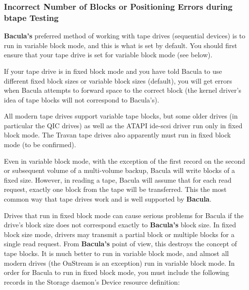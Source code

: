 \label{IncorrectBlocks}

\subsubsection*{Incorrect Number of Blocks or Positioning Errors during btape
Testing}

{\bf Bacula's} preferred method of working with tape drives (sequential
devices) is to run in variable block mode, and this is what is set by default.
You should first ensure that your tape drive is set for variable block mode
(see below). 

If your tape drive is in fixed block mode and you have told Bacula to use
different fixed block sizes or variable block sizes (default), you will get
errors when Bacula attempts to forward space to the correct block (the kernel
driver's idea of tape blocks will not correspond to Bacula's). 

All modern tape drives support variable tape blocks, but some older drives (in
particular the QIC drives) as well as the ATAPI ide-scsi driver run only in
fixed block mode. The Travan tape drives also apparently must run in fixed
block mode (to be confirmed). 

Even in variable block mode, with the exception of the first record on the
second or subsequent volume of a multi-volume backup, Bacula will write blocks
of a fixed size. However, in reading a tape, Bacula will assume that for each
read request, exactly one block from the tape will be transferred. This the
most common way that tape drives work and is well supported by {\bf Bacula}. 

Drives that run in fixed block mode can cause serious problems for Bacula if
the drive's block size does not correspond exactly to {\bf Bacula's} block
size. In fixed block size mode, drivers may transmit a partial block or
multiple blocks for a single read request. From {\bf Bacula's} point of view,
this destroys the concept of tape blocks. It is much better to run in variable
block mode, and almost all modern drives (the OnStream is an exception) run in
variable block mode. In order for Bacula to run in fixed block mode, you must
include the following records in the Storage daemon's Device resource
definition: 

